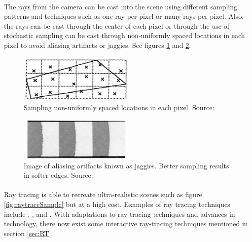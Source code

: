 \paragraph{}
The rays from the camera can be cast into the scene using different sampling patterns and techniques such as one ray per pixel or many rays per pixel.  Also, the rays can be cast through the center of each pixel or through the use of stochastic sampling can be cast through non-uniformly spaced locations in each pixel to avoid aliasing artifacts or jaggies. See figures \ref{fig:sampling} and \ref{fig:jaggies}.

\begin{figure}[h!]
  \centering
    \includegraphics[width=0.5\textwidth]{sampling.jpg}
  \caption{Sampling non-uniformly spaced locations in each pixel. Source: \protect\cite{Reeves1987}}
	\label{fig:sampling}
\end{figure}

\begin{figure}[h!]
  \centering
    \includegraphics[width=0.5\textwidth]{jaggies.jpg}
  \caption{Image of aliasing artifacts known as jaggies. Better sampling results in softer edges. Source: \protect\cite{Reeves1987}}
	\label{fig:jaggies}
\end{figure}

\paragraph{}
Ray tracing is able to recreate ultra-realistic scenes such as figure \ref{fig:raytraceSample} but at a high cost.  Examples of ray tracing techniques include \cite{Whitted1980}, \cite{Cook1986}, and \cite{Ward1988}.  With adaptations to ray tracing techniques and advances in technology, there now exist some interactive ray-tracing techniques mentioned in section \ref{sec:RT}.

